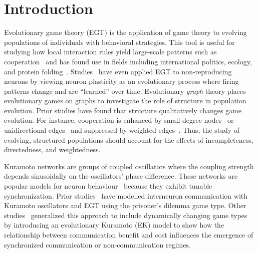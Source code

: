 \documentclass[pdflatex,lineno,referee,sn-nature]{sn-jnl}
\begin{document}
\section{Introduction}
Evolutionary game theory (EGT) is the application
of game theory to evolving populations
of individuals with behavioral strategies.
This tool is useful for studying how local interaction rules
yield large-scale patterns such as cooperation~\citep{sigmund1999evolutionary}
and has found use in fields including international politics, ecology,
and protein folding~\citep{traulsen2023future}.
Studies~\citep{cohen2009evolutionary,antonioni2017coevolution,tripp2022evolutionary}
have even applied EGT to non-reproducing neurons
by viewing neuron plasticity as an evolutionary process
where firing patterns change and are ``learned'' over time.
Evolutionary \emph{graph} theory places evolutionary games
on graphs to investigate the role of structure in population evolution.
Prior studies have found that structure
qualitatively changes game evolution.
For instance, cooperation is enhanced by
small-degree nodes~\citep{ohtsuki2006simple}
or unidirectional edges~\citep{su2022evolution}
and suppressed by weighted edges~\citep{bhaumik2024constant}.
Thus, the study of evolving, structured populations
should account for the effects of
incompleteness, directedness, and weightedness.

Kuramoto networks are groups of coupled oscillators
where the coupling strength depends sinusoidally
on the oscillators' phase difference.
These networks are popular
models for neuron behaviour~\citep{cabral2011role,deng2024chimera}
because they exhibit tunable synchronization.
Prior studies~\citep{antonioni2017coevolution}
have modelled interneuron communication
with Kuramoto oscillators and EGT
using the prisoner's dilemma game type.
Other studies~\citep{tripp2022evolutionary}
generalized this approach to include dynamically changing game types
by introducing an evolutionary Kuramoto (EK) model
to show how the relationship between communication benefit and cost
influences the emergence of synchronized communication
or non-communication regimes.
\end{document}
